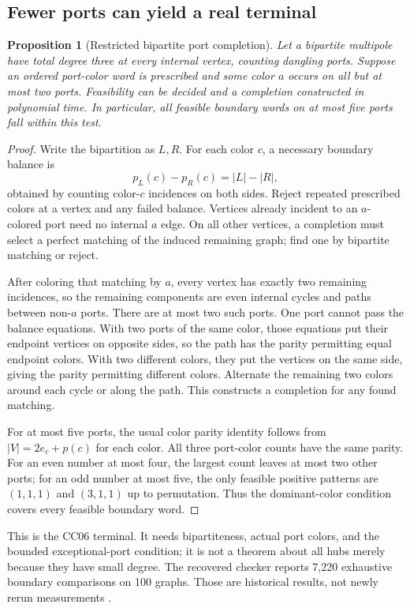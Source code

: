 \documentclass[11pt,letterpaper]{article}
\newtheorem{proposition}[theorem]{Proposition}
\theoremstyle{definition}
\begin{document}
\subsection{Fewer ports can yield a real terminal}

\begin{proposition}[Restricted bipartite port completion]\label{prop:ports}
Let a bipartite multipole have total degree three at every internal vertex, counting dangling ports. Suppose an ordered port-color word is prescribed and some color $a$ occurs on all but at most two ports. Feasibility can be decided and a completion constructed in polynomial time. In particular, all feasible boundary words on at most five ports fall within this test.
\end{proposition}
\begin{proof}
Write the bipartition as $L,R$. For each color $c$, a necessary boundary balance is
\[
p_L(c)-p_R(c)=|L|-|R|,
\]
obtained by counting color-$c$ incidences on both sides. Reject repeated prescribed colors at a vertex and any failed balance. Vertices already incident to an $a$-colored port need no internal $a$ edge. On all other vertices, a completion must select a perfect matching of the induced remaining graph; find one by bipartite matching or reject.

After coloring that matching by $a$, every vertex has exactly two remaining incidences, so the remaining components are even internal cycles and paths between non-$a$ ports. There are at most two such ports. One port cannot pass the balance equations. With two ports of the same color, those equations put their endpoint vertices on opposite sides, so the path has the parity permitting equal endpoint colors. With two different colors, they put the vertices on the same side, giving the parity permitting different colors. Alternate the remaining two colors around each cycle or along the path. This constructs a completion for any found matching.

For at most five ports, the usual color parity identity follows from $|V|=2e_c+p(c)$ for each color. All three port-color counts have the same parity. For an even number at most four, the largest count leaves at most two other ports; for an odd number at most five, the only feasible positive patterns are $(1,1,1)$ and $(3,1,1)$ up to permutation. Thus the dominant-color condition covers every feasible boundary word.
\end{proof}

This is the CC06 terminal. It needs bipartiteness, actual port colors, and the bounded exceptional-port condition; it is not a theorem about all hubs merely because they have small degree. The recovered checker reports 7,220 exhaustive boundary comparisons on 100 graphs. Those are historical results, not newly rerun measurements \cite{cc06}.
\end{document}
